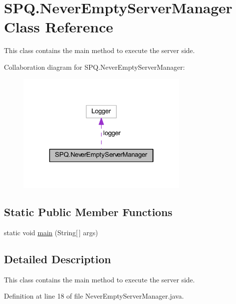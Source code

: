 \hypertarget{class_s_p_q_1_1_never_empty_server_manager}{}\section{S\+P\+Q.\+Never\+Empty\+Server\+Manager Class Reference}
\label{class_s_p_q_1_1_never_empty_server_manager}


This class contains the main method to execute the server side.  




Collaboration diagram for S\+P\+Q.\+Never\+Empty\+Server\+Manager\+:\nopagebreak
\begin{figure}[H]
\begin{center}
\leavevmode
\includegraphics[width=238pt]{class_s_p_q_1_1_never_empty_server_manager__coll__graph}
\end{center}
\end{figure}
\subsection*{Static Public Member Functions}
\begin{DoxyCompactItemize}
\item 
static void \mbox{\hyperlink{class_s_p_q_1_1_never_empty_server_manager_a999f5ecf0ed5f60f8661d0064420fdbd}{main}} (String\mbox{[}$\,$\mbox{]} args)
\end{DoxyCompactItemize}


\subsection{Detailed Description}
This class contains the main method to execute the server side. 

Definition at line 18 of file Never\+Empty\+Server\+Manager.\+java.



